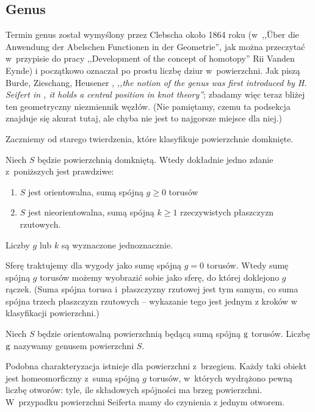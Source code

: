 
\subsection{Genus}
%
Termin genus został wymyślony przez Clebscha około 1864 roku (w~,,Über die Anwendung der Abelschen Functionen in der Geometrie'', jak można przeczytać w~przypisie do pracy ,,Development of the concept of homotopy'' Rii Vanden Eynde) i początkowo oznaczał po prostu liczbę dziur w~powierzchni.
Jak piszą Burde, Zieschang, Heusener \cite[s. 20]{burde2014}, \emph{,,the notion of the genus was first introduced by H. Seifert in \cite{seifert1935}, it holds a central position in knot theory''}; zbadamy więc teraz bliżej ten geometryczny niezmiennik węzłów.
(Nie pamiętamy, czemu ta podsekcja znajduje się akurat tutaj, ale chyba nie jest to najgorsze miejsce dla niej.)

Zaczniemy od starego twierdzenia, które klasyfikuje powierzchnie domknięte.

\begin{proposition}
    Niech $S$ będzie powierzchnią domkniętą.
    Wtedy dokładnie jedno zdanie z~poniższych jest prawdziwe:
    \begin{enumerate}[leftmargin=*]
        \itemsep0em
        \item $S$ jest orientowalna, sumą spójną $g \ge 0$ torusów
        \item $S$ jest nieorientowalna, sumą spójną $k \ge 1$ rzeczywistych płaszczyzn rzutowych.
    \end{enumerate}
    Liczby $g$ lub $k$ są wyznaczone jednoznacznie. %
\end{proposition}

Sferę traktujemy dla wygody jako sumę spójną $g = 0$ torusów.
Wtedy sumę spójną $g$ torusów możemy wyobrazić sobie jako sferę, do której doklejono $g$ rączek.
(Suma spójna torusa i~płaszczyzny rzutowej jest tym samym, co suma spójna trzech płaszczyzn rzutowych -- wykazanie tego jest jednym z kroków w klasyfikacji powierzchni.)

\begin{definition}
    Niech $S$ będzie orientowalną powierzchnią będącą sumą spójną $\operatorname{g}$ torusów.
    Liczbę $\operatorname{g}$ nazywamy genusem powierzchni $S$.
\end{definition}

Podobna charakteryzacja istnieje dla powierzchni z~brzegiem.
Każdy taki obiekt jest homeomorficzny z~sumą spójną $g$ torusów, w~których wydrążono pewną liczbę otworów: tyle, ile składowych spójności ma brzeg powierzchni.
W~przypadku powierzchni Seiferta mamy do czynienia z jednym otworem.

